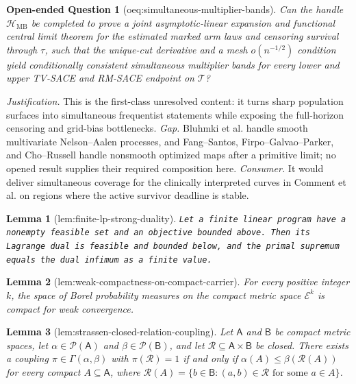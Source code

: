 \documentclass{article}
\newtheorem{lemma}{Lemma}
\newtheorem{openendedquestion}{Open-ended Question}
\begin{document}
\begin{openendedquestion}[oeq:simultaneous-multiplier-bands]\label{oeq:simultaneous-multiplier-bands}
Can the handle \(\mathscr H_{\mathrm{MB}}\) be completed to prove a joint asymptotic-linear expansion and functional central limit theorem for the estimated marked arm laws and censoring survival through \(\tau\), such that the unique-cut derivative and a mesh \(o(n^{-1/2})\) condition yield conditionally consistent simultaneous multiplier bands for every lower and upper TV-SACE and RM-SACE endpoint on \(\mathcal T\)?
\end{openendedquestion}
\par\smallskip\noindent \textit{Justification.} This is the first-class unresolved content: it turns sharp population surfaces into simultaneous frequentist statements while exposing the full-horizon censoring and grid-bias bottlenecks. \textit{Gap.} Bluhmki et al. handle smooth multivariate Nelson--Aalen processes, and Fang--Santos, Firpo--Galvao--Parker, and Cho--Russell handle nonsmooth optimized maps after a primitive limit; no opened result supplies their required composition here. \textit{Consumer.} It would deliver simultaneous coverage for the clinically interpreted curves in Comment et al. on regions where the active survivor deadline is stable.

\begin{lemma}[lem:finite-lp-strong-duality]\label{lem:finite-lp-strong-duality}
\texttt{Let a finite linear program have a nonempty feasible set and an objective bounded above.  Then its Lagrange dual is feasible and bounded below,\allowbreak{} and the primal supremum equals the dual infimum as a finite value.}
\end{lemma}

\begin{lemma}[lem:weak-compactness-on-compact-carrier]\label{lem:weak-compactness-on-compact-carrier}
For every positive integer \(k\), the space of Borel probability measures on the compact metric space \(\mathcal E^k\) is compact for weak convergence.
\end{lemma}

\begin{lemma}[lem:strassen-closed-relation-coupling]\label{lem:strassen-closed-relation-coupling}
Let \(\mathsf A\) and \(\mathsf B\) be compact metric spaces, let \(\alpha\in\mathcal P(\mathsf A)\) and \(\beta\in\mathcal P(\mathsf B)\), and let \(\mathcal R\subseteq\mathsf A\times\mathsf B\) be closed.  There exists a coupling \(\pi\in\Gamma(\alpha,\beta)\) with \(\pi(\mathcal R)=1\) if and only if \(\alpha(A)\leq\beta(\mathcal R(A))\) for every compact \(A\subseteq\mathsf A\), where \(\mathcal R(A)=\{b\in\mathsf B:(a,b)\in\mathcal R\text{ for some }a\in A\}\).
\end{lemma}
\end{document}
